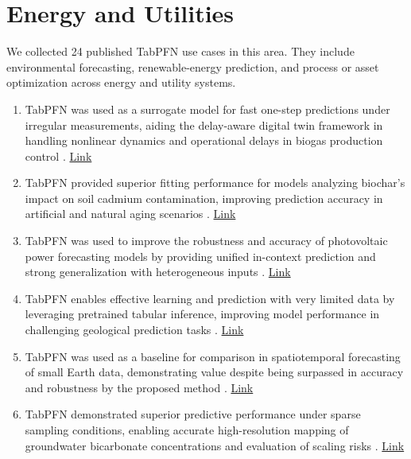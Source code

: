 \section*{Energy and Utilities}

We collected 24 published TabPFN use cases in this area. They include environmental forecasting, renewable-energy prediction, and process or asset optimization across energy and utility systems.

\begin{enumerate}

\item TabPFN was used as a surrogate model for fast one-step predictions under irregular measurements, aiding the delay-aware digital twin framework in handling nonlinear dynamics and operational delays in biogas production control \cite{wang2026aidriven}. \href{https://doi.org/10.1016/j.compchemeng.2026.109637}{Link}

\item TabPFN provided superior fitting performance for models analyzing biochar's impact on soil cadmium contamination, improving prediction accuracy in artificial and natural aging scenarios \cite{meng2026achieve}. \href{https://www.sciencedirect.com/science/article/pii/S0016706126001205}{Link}

\item TabPFN was used to improve the robustness and accuracy of photovoltaic power forecasting models by providing unified in-context prediction and strong generalization with heterogeneous inputs \cite{qiao2026cloudedgecollaborativelargemodels}. \href{https://arxiv.org/pdf/2603.22343}{Link}

\item TabPFN enables effective learning and prediction with very limited data by leveraging pretrained tabular inference, improving model performance in challenging geological prediction tasks \cite{wang2026predicting}. \href{https://link.springer.com/article/10.1007/s00603-026-05420-3}{Link}

\item TabPFN was used as a baseline for comparison in spatiotemporal forecasting of small Earth data, demonstrating value despite being surpassed in accuracy and robustness by the proposed method \cite{yang2025simplerobustforecastingspatiotemporally}. \href{http://arxiv.org/abs/2510.08920v1}{Link}

\item TabPFN demonstrated superior predictive performance under sparse sampling conditions, enabling accurate high-resolution mapping of groundwater bicarbonate concentrations and evaluation of scaling risks \cite{doiLeveragingTabPFN}. \href{https://doi.org/10.6084/m9.figshare.31646935.v1}{Link}


\end{enumerate}
